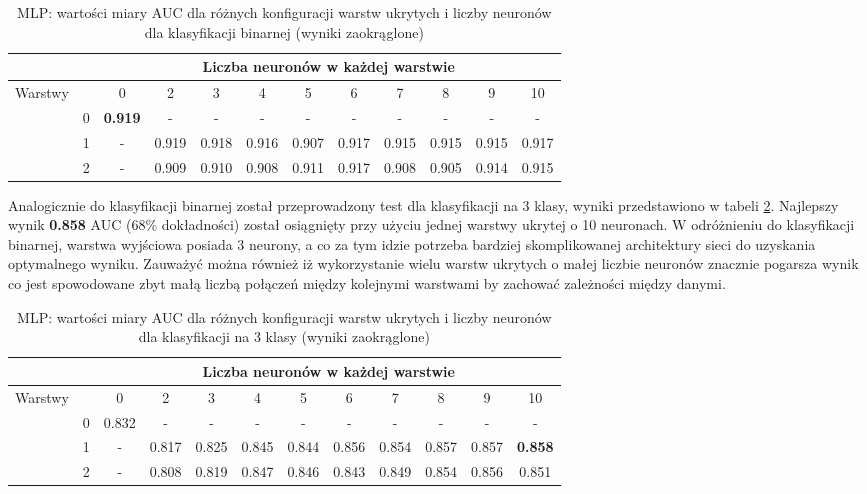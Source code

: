 \documentclass[a4paper, twoside, 11pt, openright]{article}
\begin{document}
\begin{table}[H]
    \centering
    \begin{tabular}{|c|c|c|c|c|c|c|c|c|c|c|c|}
        \hline
         & &  \multicolumn{10}{c|}{Liczba neuronów w każdej warstwie}  \\ \hline
        \multirow{4}{*}{Warstwy} & & 0 & 2 & 3 & 4 & 5 & 6 & 7 & 8 & 9 & 10  \\ \cline{2 - 12}
			& 0 & \textbf{0.919} & - & - & - & - & - & - & - & - & - \\ \cline{2 - 12} 
			& 1 & - &  0.919 &  0.918 &  0.916 &  0.907 &  0.917 &  0.915 &  0.915 &  0.915  & 0.917 \\ \cline{2 - 12} 
			& 2 & - & 0.909 &    0.910 &   0.908 &   0.911 &   0.917 &   0.908 &   0.905 &   0.914 & 0.915 \\ \cline{2 - 12} \hline

    \end{tabular}
    \caption{MLP: wartości miary AUC dla różnych konfiguracji warstw ukrytych i liczby neuronów dla klasyfikacji binarnej (wyniki zaokrąglone)}
    \label{tab:nn_layers_binary}
\end{table}

Analogicznie do klasyfikacji binarnej został przeprowadzony test dla klasyfikacji na 3 klasy, wyniki przedstawiono w tabeli \ref{tab:nn_layers_discrete}. Najlepszy wynik \textbf{0.858} AUC (68\% dokładności) został osiągnięty przy użyciu jednej warstwy ukrytej o 10 neuronach. W odróżnieniu do klasyfikacji binarnej, warstwa wyjściowa posiada 3 neurony, a co za tym idzie potrzeba bardziej skomplikowanej architektury sieci do uzyskania optymalnego wyniku. Zauważyć można również iż wykorzystanie wielu warstw ukrytych o małej liczbie neuronów znacznie pogarsza wynik co jest spowodowane zbyt małą liczbą połączeń między kolejnymi warstwami by zachować zależności między danymi.

\begin{table}[H]
    \centering
    \begin{tabular}{|c|c|c|c|c|c|c|c|c|c|c|c|}
        \hline
         & &  \multicolumn{10}{c|}{Liczba neuronów w każdej warstwie}  \\ \hline
        \multirow{4}{*}{Warstwy} & & 0 & 2 & 3 & 4 & 5 & 6 & 7 & 8 & 9 & 10  \\ \cline{2 - 12}
			& 0 & 0.832 & - & - & - & - & - & - & - & - & - \\ \cline{2 - 12} 
			& 1 & - &  0.817 &  0.825 &  0.845 &  0.844 &  0.856 &  0.854 &  0.857 &  0.857 & \textbf{0.858} \\ \cline{2 - 12} 
			& 2 & - & 0.808 &   0.819 &   0.847 &   0.846 &   0.843 &   0.849 &   0.854 &   0.856 &   0.851  \\ \cline{2 - 12} \hline

    \end{tabular}
    \caption{MLP: wartości miary AUC dla różnych konfiguracji warstw ukrytych i liczby neuronów dla klasyfikacji na 3 klasy (wyniki zaokrąglone)}
    \label{tab:nn_layers_discrete}
\end{table}
\end{document}
